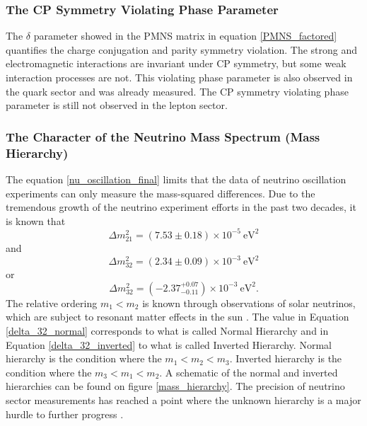\subsubsection{The CP Symmetry Violating Phase Parameter}

The $\delta$ parameter showed in the PMNS matrix in equation \ref{PMNS_factored} quantifies the charge conjugation and parity symmetry violation. The strong and electromagnetic interactions are invariant under CP symmetry, but some weak interaction processes are not. This violating phase parameter is also observed in the quark sector and was already measured. The CP symmetry violating phase parameter is still not observed in the lepton sector.

\subsubsection{The Character of the Neutrino Mass Spectrum (Mass Hierarchy)}

The equation \ref{nu_oscillation_final} limits that the data of neutrino oscillation experiments can only measure the mass-squared differences. Due to the tremendous growth of the neutrino experiment efforts in the past two decades, it is known that \cite{delta_2_1}
%
\begin{equation}
	\Delta m^2_{21} = (7.53 \pm 0.18) \times 10^{-5} \ \text{eV}^2
	\label{delta_21}
\end{equation}
%
and \cite{delta_3_2}
%
\begin{equation}
	\Delta m^2_{32} = (2.34 \pm 0.09) \times 10^{-3} \ \text{eV}^2
	\label{delta_32_normal}
\end{equation}
%
or 
%
\begin{equation}
	\Delta m^2_{32} = (-2.37^{+0.07}_{-0.11}) \times 10^{-3} \ \text{eV}^2.
	\label{delta_32_inverted}
\end{equation}
%
The relative ordering $m_1 < m_2$ is known through observations of solar neutrinos, which are subject to resonant matter effects in the sun \cite{delta_2_1}. The value in Equation \ref{delta_32_normal} corresponds to what is called Normal Hierarchy and in Equation \ref{delta_32_inverted} to what is called Inverted Hierarchy. Normal hierarchy is the condition where the $m_1 < m_2 < m_3$. Inverted hierarchy is the condition where the $m_3 < m_1 < m_2$. A schematic of the normal and inverted hierarchies can be found on figure \ref{mass_hierarchy}. The precision of neutrino sector measurements has reached a point where the unknown hierarchy is a major hurdle to further progress \cite{prospects_patterson}.

